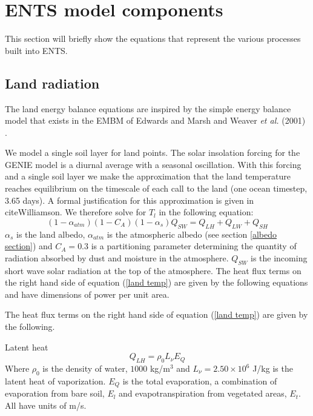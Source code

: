 \documentclass[10pt,a4paper]{report}
\begin{document}
\tableofcontents

\chapter{ENTS model components}

This section will briefly show the equations that represent the
various processes built into ENTS.

\section{Land radiation}

The land energy balance equations are inspired by the simple energy
balance model that exists in the EMBM of Edwards and Marsh
\cite{Marsh and Edwards} and Weaver {\em et al.} (2001) \cite{Uvic}.

We model a single soil layer for land points. The solar insolation
forcing for the GENIE model is a diurnal average with a seasonal
oscillation. With this forcing and a single soil layer we make the
approximation that the land temperature reaches equilibrium on the
timescale of each call to the land (one ocean timestep, 3.65 days).
A formal justification for this approximation is given in
cite{Williamson}. We therefore solve for $T_{l}$ in the following
equation:
\begin{equation}\label{land temp}
(1-\alpha_{atm})(1-C_{A})(1-\alpha_{s})Q_{SW} =  Q_{LH} + Q_{LW} +
Q_{SH}
\end{equation}
$\alpha_{s}$ is the land albedo, $\alpha_{atm}$ is the atmospheric
albedo (see section \ref{albedo section}) and $C_A = 0.3$ is a
partitioning parameter determining the quantity of radiation
absorbed by dust and moisture in the atmosphere. $Q_{SW}$ is the
incoming short wave solar radiation at the top of the atmosphere.
The heat flux terms on the right hand side of equation (\ref{land
temp}) are given by the following equations and have dimensions of
power per unit area.

The heat flux terms on the right hand side of equation (\ref{land
temp}) are given by the following.

Latent heat
\begin{equation}
Q_{LH}=\rho_{0} L_{\nu} E_{Q}
\end{equation}
Where $\rho_{0}$ is the density of water, $1000$ kg/m$^3$ and
$L_{\nu}=2.50 \times 10^6$ J/kg is the latent heat of vaporization.
$E_{Q}$ is the total evaporation, a combination of evaporation from
bare soil, $E_l$ and evapotranspiration from vegetated areas, $E_t$.
All have units of m/s.
\end{document}
